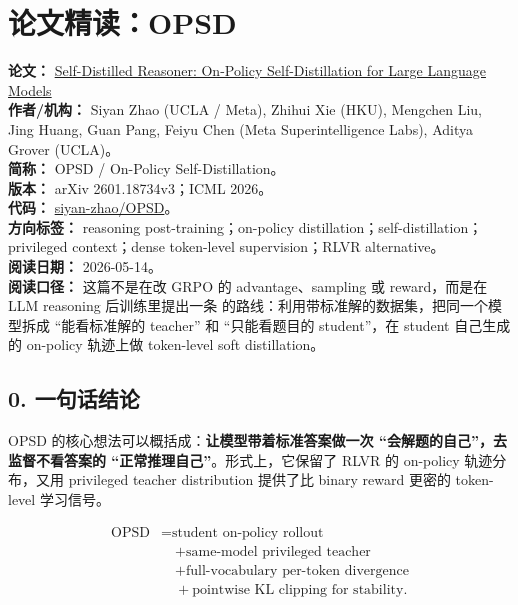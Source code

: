 
\section{论文精读：OPSD}

\begin{conceptbox}
\textbf{论文：} \href{https://arxiv.org/abs/2601.18734}{Self-Distilled Reasoner: On-Policy Self-Distillation for Large Language Models}\\
\textbf{作者/机构：} Siyan Zhao (UCLA / Meta), Zhihui Xie (HKU), Mengchen Liu, Jing Huang, Guan Pang, Feiyu Chen (Meta Superintelligence Labs), Aditya Grover (UCLA)。\\
\textbf{简称：} OPSD / On-Policy Self-Distillation。\\
\textbf{版本：} arXiv 2601.18734v3；ICML 2026。\\
\textbf{代码：} \href{https://github.com/siyan-zhao/OPSD}{siyan-zhao/OPSD}。\\
\textbf{方向标签：} reasoning post-training；on-policy distillation；self-distillation；privileged context；dense token-level supervision；RLVR alternative。\\
\textbf{阅读日期：} 2026-05-14。\\
\textbf{阅读口径：} 这篇不是在改 GRPO 的 advantage、sampling 或 reward，而是在 LLM reasoning 后训练里提出一条  的路线：利用带标准解的数据集，把同一个模型拆成 ``能看标准解的 teacher'' 和 ``只能看题目的 student''，在 student 自己生成的 on-policy 轨迹上做 token-level soft distillation。
\end{conceptbox}

\subsection{0. 一句话结论}

OPSD 的核心想法可以概括成：\textbf{让模型带着标准答案做一次 ``会解题的自己''，去监督不看答案的 ``正常推理自己''}。形式上，它保留了 RLVR 的 on-policy 轨迹分布，又用 privileged teacher distribution 提供了比 binary reward 更密的 token-level 学习信号。

\[
\begin{aligned}
\text{OPSD}
&= \text{student on-policy rollout}\\
&\quad + \text{same-model privileged teacher}\\
&\quad + \text{full-vocabulary per-token divergence}\\
&\quad + \text{pointwise KL clipping for stability}.
\end{aligned}
\]

